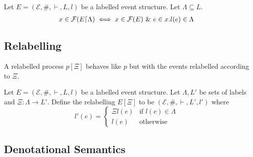 \documentclass{article}
\begin{document}
\begin{proposition}
    
Let $E = (\mathcal{E},\#,\vdash,L,l)$ be a labelled event structure. 
Let $\Lambda \subseteq L$.
\begin{align*}
    x \in \mathcal{F}(E\lceil\Lambda) \iff x \in \mathcal{F}(E) \ \& \  e \in x.l(e) \in \Lambda
\end{align*}

\end{proposition}

\subsection{Relabelling}

A relabelled process $p[\Xi]$ behaves like $p$ but with the events relabelled according to $\Xi$.

\begin{definition}
    
Let $E = (\mathcal{E},\#,\vdash,L,l)$ be a labelled event structure.
Let $\Lambda,L'$ be sets of labels and $\Xi: \Lambda \rightarrow L'$.
Define the relabelling $E[\Xi]$ to be $(\mathcal{E},\#,\vdash,L',l')$ where
$$
    l'(e) = \begin{cases}
        \Xi l(e) & \text{if } l(e) \in \Lambda \\
        l(e) & \text{otherwise}
    \end{cases}
$$

\end{definition}
\subsection{Denotational Semantics}
\end{document}
